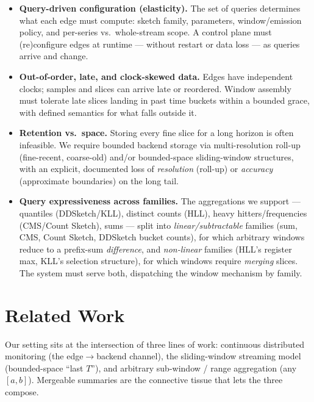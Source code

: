 \begin{itemize}
  \item \textbf{Query-driven configuration (elasticity).} The set of
  queries determines what each edge must compute: sketch family,
  parameters, window/emission policy, and per-series vs.\ whole-stream
  scope. A control plane must (re)configure edges at runtime --- without
  restart or data loss --- as queries arrive and change.

  \item \textbf{Out-of-order, late, and clock-skewed data.} Edges have
  independent clocks; samples and slices can arrive late or reordered.
  Window assembly must tolerate late slices landing in past time buckets
  within a bounded grace, with defined semantics for what falls outside
  it.

  \item \textbf{Retention vs.\ space.} Storing every fine slice for a long
  horizon is often infeasible. We require bounded backend storage via
  multi-resolution roll-up (fine-recent, coarse-old) and/or bounded-space
  sliding-window structures, with an explicit, documented loss of
  \emph{resolution} (roll-up) or \emph{accuracy} (approximate boundaries)
  on the long tail.

  \item \textbf{Query expressiveness across families.} The aggregations
  we support --- quantiles (DDSketch/KLL), distinct counts (HLL), heavy
  hitters/frequencies (CMS/Count Sketch), sums --- split into
  \emph{linear/subtractable} families (sum, CMS, Count Sketch, DDSketch
  bucket counts), for which arbitrary windows reduce to a prefix-sum
  \emph{difference}, and \emph{non-linear} families (HLL's register max,
  KLL's selection structure), for which windows require \emph{merging}
  slices. The system must serve both, dispatching the window mechanism by
  family.
\end{itemize}


\section{Related Work}
\label{sec:related}

Our setting sits at the intersection of three lines of work: continuous
distributed monitoring (the edge$\rightarrow$backend channel), the
sliding-window streaming model (bounded-space ``last $T$''), and
arbitrary sub-window / range aggregation (any $[a,b]$). Mergeable
summaries are the connective tissue that lets the three compose.


